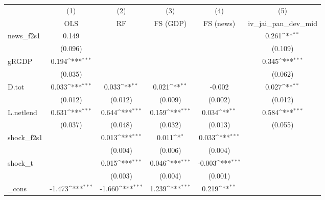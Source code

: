 {
\def\sym#1{\ifmmode^{#1}\else\(^{#1}\)\fi}
\begin{tabular}{l*{5}{c}}
\toprule
            &\multicolumn{1}{c}{(1)}&\multicolumn{1}{c}{(2)}&\multicolumn{1}{c}{(3)}&\multicolumn{1}{c}{(4)}&\multicolumn{1}{c}{(5)}\\
            &\multicolumn{1}{c}{OLS}&\multicolumn{1}{c}{RF}&\multicolumn{1}{c}{FS (GDP)}&\multicolumn{1}{c}{FS (news)}&\multicolumn{1}{c}{iv\_jai\_pan\_dev\_mid}\\
\midrule
news\_f2s1   &       0.149         &                     &                     &                     &       0.261\sym{**} \\
            &     (0.096)         &                     &                     &                     &     (0.109)         \\
\addlinespace
gRGDP       &       0.194\sym{***}&                     &                     &                     &       0.345\sym{***}\\
            &     (0.035)         &                     &                     &                     &     (0.062)         \\
\addlinespace
D.tot       &       0.033\sym{***}&       0.033\sym{**} &       0.021\sym{**} &      -0.002         &       0.027\sym{**} \\
            &     (0.012)         &     (0.012)         &     (0.009)         &     (0.002)         &     (0.012)         \\
\addlinespace
L.netlend   &       0.631\sym{***}&       0.644\sym{***}&       0.159\sym{***}&       0.034\sym{**} &       0.584\sym{***}\\
            &     (0.037)         &     (0.048)         &     (0.032)         &     (0.013)         &     (0.055)         \\
\addlinespace
shock\_f2s1  &                     &       0.013\sym{***}&       0.011\sym{*}  &       0.033\sym{***}&                     \\
            &                     &     (0.004)         &     (0.006)         &     (0.004)         &                     \\
\addlinespace
shock\_t     &                     &       0.015\sym{***}&       0.046\sym{***}&      -0.003\sym{***}&                     \\
            &                     &     (0.003)         &     (0.004)         &     (0.001)         &                     \\
\addlinespace
\_cons      &      -1.473\sym{***}&      -1.660\sym{***}&       1.239\sym{***}&       0.219\sym{**} &                     \\

\end{tabular}}
